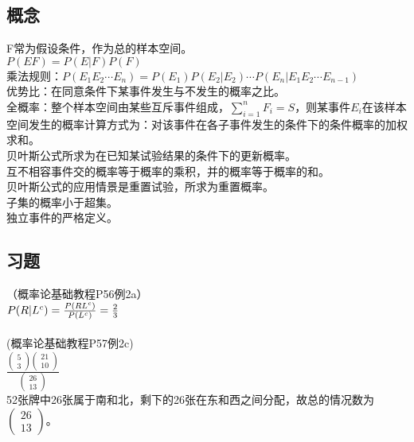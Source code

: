 \documentclass{book}%
\begin{document}
    \subsection{概念}
    F常为假设条件，作为总的样本空间。\\
    $P(EF)=P(E|F)P(F)$\\
    乘法规则：$P(E_{1}E_{2}\cdots E_{n})=P(E_{1})P(E_{2}|E_{2})\cdots P(E_{n}|E_{1}E_{2}\cdots E_{n-1})$\\
    优势比：在同意条件下某事件发生与不发生的概率之比。\\
    全概率：整个样本空间由某些互斥事件组成，$\sum_{i=1}^{n}F_{i}=S$，则某事件$E_{i}$在该样本空间发生的概率计算方式为：对该事件在各子事件发生的条件下的条件概率的加权求和。\\
    贝叶斯公式所求为在已知某试验结果的条件下的更新概率。\\
    互不相容事件交的概率等于概率的乘积，并的概率等于概率的和。\\
    贝叶斯公式的应用情景是重置试验，所求为重置概率。\\
    子集的概率小于超集。\\
    独立事件的严格定义。\\
    
    \subsection{习题}
    （概率论基础教程P56例2a）\\
    $P(R|L^{c})=\frac{P(RL^{c})}{P(L^{c})}=\frac{2}{3}\\$\\
    ~\\
    
    (概率论基础教程P57例2c)\\
    $\frac{\begin{pmatrix}
    	5\\3
    \end{pmatrix}\begin{pmatrix}
    21\\10
    \end{pmatrix}}{\begin{pmatrix}
    26\\13
	\end{pmatrix}}$\\
	52张牌中26张属于南和北，剩下的26张在东和西之间分配，故总的情况数为$\begin{pmatrix}
	26\\13
	\end{pmatrix}$。\\
	~\\
\end{document}

